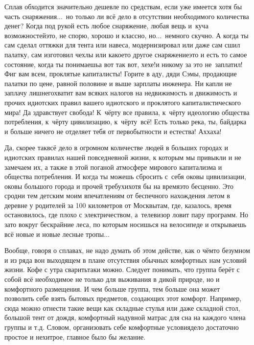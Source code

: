 Сплав обходится значительно дешевле по средствам, если уже имеется хотя бы часть снаряжения$\ldots$~но только ли всё дело в отсутствии необходимого количества денег? Когда под рукой есть любое снаряжение, любая вещь и~куча возможностей\mdash это, не спорю, хорошо и классно, но$\ldots$~немного скучно. А когда ты сам сделал оттяжки для тента или навеса, модернизировал или даже сам сшил палатку, сам изготовил чехлы или какое\sdash то другое снаряжение\mdash это и есть то самое состояние, когда ты понимаешь\mdash а вот так вот, хе\sdash хе!\mdash и никому за это не~заплатил! Фиг вам всем, проклятые капиталисты! Горите в аду, дяди Сэмы, продающие палатки по цене, равной половине и выше зарплаты инженера. Ни капли не заплачу лишнего\mdash хватит вам всяких налогов на недвижимость и движимость и прочих идиотских правил вашего идиотского и проклятого капиталистического мира! Да здравствует свобода! К~чёрту все правила, к~чёрту идеологию общества потребления, к~чёрту цивилизацию, к~чёрту~всё! Есть только река, ты, байдарка и больше ничего не отделяет тебя от первобытности и естества! Ах\sdash ха\sdash ха!

Да, скорее так\mdash всё дело в огромном количестве людей в больших городах и идиотских правилах нашей повседневной жизни, к которым мы привыкли и не замечаем их, а также в этой поганой атмосфере мирового капитализма и общества потребления. И когда ты можешь сбросить с~себя оковы цивилизации, оковы большого города и прочей требухи\mdash хотя бы на время\mdash это бесценно. Это сродни тем детским моим впечатлениям от беспечного нахождения летом в деревне у родителей за 100 километров от Москвы\mdash там, где, казалось, время остановилось, где плохо с электричеством, а~телевизор ловит пару программ. Но зато вокруг бескрайние леса, по которым носишься на велосипеде и открываешь всё новые и новые лесные тропы$\ldots$ 

Вообще, говоря о сплавах, не надо думать об этом действе, как о чём\sdash то безумном и из ряда вон выходящем в плане отсутствия обычных комфортных нам условий жизни. Кофе с утра сварить\sdash таки можно. Следует понимать, что группа берёт с собой всё необходимое не только для выживания в дикой природе, но и комфортного размещения. И чем больше группа, тем больше она может позволить себе взять бытовых предметов, создающих этот комфорт. Например, сюда можно отнести такие вещи как складные стулья или даже складной стол, большой тент от дождя, комфортный надувной матрас для сна на каждого члена группы и т.д. Словом, организовать себе комфортные условия\mdash дело достаточно простое и нехитрое, главное было бы желание. 


